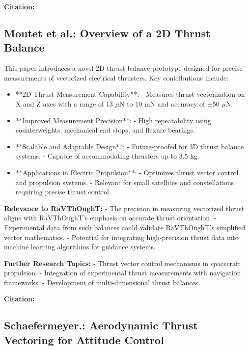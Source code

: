 \textbf{Citation:} 

\subsection{Moutet et al.: Overview of a 2D Thrust Balance}

This paper introduces a novel 2D thrust balance prototype designed for precise measurements of vectorized electrical thrusters. Key contributions include:

\begin{itemize}
  \item **2D Thrust Measurement Capability**:
  - Measures thrust vectorization on X and Z axes with a range of 13 \(\mu\text{N}\) to 10 \(\text{mN}\) and accuracy of ±50 \(\mu\text{N}\).

  \item **Improved Measurement Precision**:
  - High repeatability using counterweights, mechanical end stops, and flexure bearings.

  \item **Scalable and Adaptable Design**:
  - Future-proofed for 3D thrust balance systems.
  - Capable of accommodating thrusters up to 3.5 kg.

  \item **Applications in Electric Propulsion**:
  - Optimizes thrust vector control and propulsion systems.
  - Relevant for small satellites and constellations requiring precise thrust control.
\end{itemize}

\textbf{Relevance to RaVThOughT:}
- The precision in measuring vectorized thrust aligns with RaVThOughT's emphasis on accurate thrust orientation.
- Experimental data from such balances could validate RaVThOughT's simplified vector mathematics.
- Potential for integrating high-precision thrust data into machine learning algorithms for guidance systems.

\textbf{Further Research Topics:}
- Thrust vector control mechanisms in spacecraft propulsion.
- Integration of experimental thrust measurements with navigation frameworks.
- Development of multi-dimensional thrust balances.

\textbf{Citation:} 

\subsection{Schaefermeyer.: Aerodynamic Thrust Vectoring for Attitude Control}

